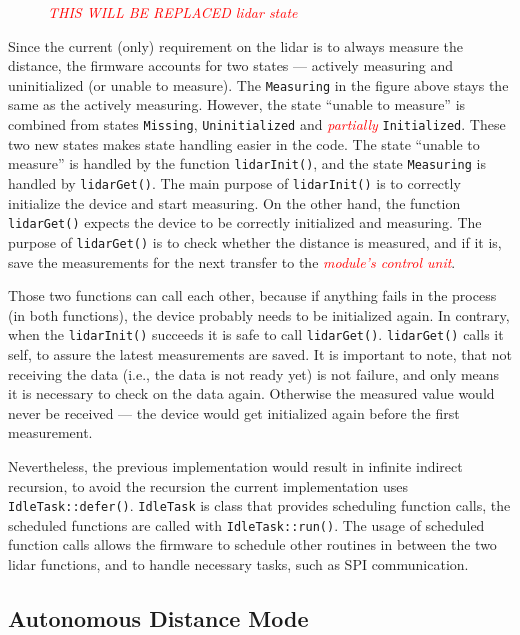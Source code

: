 \documentclass[
  digital,     %
  oneside,     %
  nosansbold,  %
  nocolorbold, %
  lof,         %
  lot,         %
]{fithesis4}
\newcommand{\TODO}[1]{\textcolor{red}{\textit{#1}}}
\begin{document}
{{{\begin{figure}[ht]
    
    \caption[Diagram of \acrshort{lidar}'s state]{\TODO{THIS WILL BE REPLACED lidar state}}
    \label{fig:lidar-state}
\end{figure}

Since the current (only) requirement on the \acrshort{lidar} is to always measure the distance, the firmware accounts for two states --- actively measuring and uninitialized (or unable to measure). The \verb|Measuring| in the figure above stays the same as the actively measuring. However, the state ``unable to measure'' is combined from states \verb|Missing|, \verb|Uninitialized| and \TODO{partially} \verb|Initialized|. These two new states makes state handling easier in the code. The state ``unable to measure'' is handled by the function \lstinline|lidarInit()|, and the state \verb|Measuring| is handled by \lstinline|lidarGet()|. The main purpose of \lstinline|lidarInit()| is to correctly initialize the device and start measuring. On the other hand, the function \lstinline|lidarGet()| expects the device to be correctly initialized and measuring. The purpose of \lstinline|lidarGet()| is to check whether the distance is measured, and if it is, save the measurements for the next transfer to the \TODO{module's control unit}.

Those two functions can call each other, because if anything fails in the process (in both functions), the device probably needs to be initialized again. In contrary, when the \lstinline|lidarInit()| succeeds it is safe to call \lstinline|lidarGet()|. \lstinline|lidarGet()| calls it self, to assure the latest measurements are saved. It is important to note, that not receiving the data (i.e., the data is not ready yet) is not failure, and only means it is necessary to check on the data again. Otherwise the measured value would never be received --- the device would get initialized again before the first measurement.

Nevertheless, the previous implementation would result in infinite indirect recursion, to avoid the recursion the current implementation uses \lstinline|IdleTask::defer()|. \lstinline|IdleTask| is class that provides scheduling function calls, the scheduled functions are called with \lstinline[breaklines=false]|IdleTask::run()|. The usage of scheduled function calls allows the firmware to schedule other routines in between the two lidar functions, and to handle necessary tasks, such as SPI communication.

\subsection{ Autonomous Distance Mode }

}}}
\end{document}
